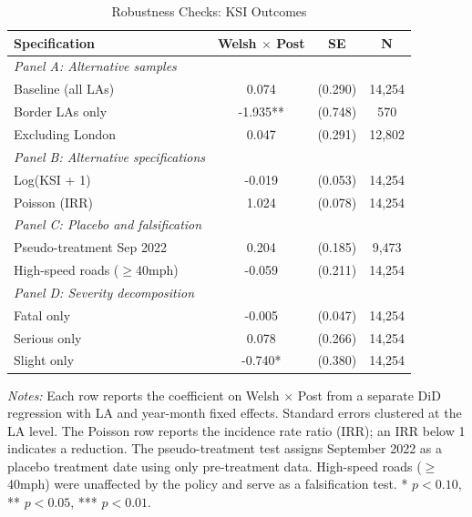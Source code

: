 \begin{table}[H]
\centering
\caption{Robustness Checks: KSI Outcomes}
\label{tab:robustness}
\begin{threeparttable}
\begin{tabular}{lccc}
\toprule
Specification & Welsh $\times$ Post & SE & N \\
\midrule
\textit{Panel A: Alternative samples} & & & \\
\quad Baseline (all LAs) & 0.074 & (0.290) & 14,254 \\
\quad Border LAs only & -1.935** & (0.748) & 570 \\
\quad Excluding London & 0.047 & (0.291) & 12,802 \\
\midrule
\textit{Panel B: Alternative specifications} & & & \\
\quad Log(KSI + 1) & -0.019 & (0.053) & 14,254 \\
\quad Poisson (IRR) & 1.024 & (0.078) & 14,254 \\
\midrule
\textit{Panel C: Placebo and falsification} & & & \\
\quad Pseudo-treatment Sep 2022 & 0.204 & (0.185) & 9,473 \\
\quad High-speed roads ($\geq$40mph) & -0.059 & (0.211) & 14,254 \\
\midrule
\textit{Panel D: Severity decomposition} & & & \\
\quad Fatal only & -0.005 & (0.047) & 14,254 \\
\quad Serious only & 0.078 & (0.266) & 14,254 \\
\quad Slight only & -0.740* & (0.380) & 14,254 \\
\bottomrule
\end{tabular}
\begin{tablenotes}[flushleft]
\small
\item \textit{Notes:} Each row reports the coefficient on Welsh $\times$ Post from a separate DiD regression with LA and year-month fixed effects. Standard errors clustered at the LA level. The Poisson row reports the incidence rate ratio (IRR); an IRR below 1 indicates a reduction. The pseudo-treatment test assigns September 2022 as a placebo treatment date using only pre-treatment data. High-speed roads ($\geq$40mph) were unaffected by the policy and serve as a falsification test. * $p<0.10$, ** $p<0.05$, *** $p<0.01$.
\end{tablenotes}
\end{threeparttable}
\end{table}
